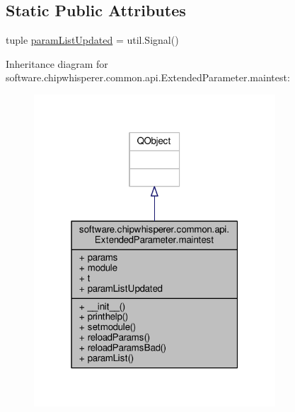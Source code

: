 \subsection*{Static Public Attributes}
\begin{DoxyCompactItemize}
\item 
tuple \hyperlink{classsoftware_1_1chipwhisperer_1_1common_1_1api_1_1ExtendedParameter_1_1maintest_a88f37b4212fcd1b6abe6a31a8a862763}{param\+List\+Updated} = util.\+Signal()
\end{DoxyCompactItemize}


Inheritance diagram for software.\+chipwhisperer.\+common.\+api.\+Extended\+Parameter.\+maintest\+:\nopagebreak
\begin{figure}[H]
\begin{center}
\leavevmode
\includegraphics[width=256pt]{df/daf/classsoftware_1_1chipwhisperer_1_1common_1_1api_1_1ExtendedParameter_1_1maintest__inherit__graph}
\end{center}
\end{figure}


